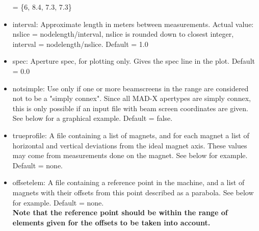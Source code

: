 \begin{itemize}
     = \{6, 8.4, 7.3, 7.3\}  
   \item interval: Approximate length in meters between
     measurements. Actual value:  nslice = nodelength/interval, nslice
     is rounded down to closest integer,  interval =
     nodelength/nslice. Default = 1.0  
   \item spec: Aperture spec, for plotting only. Gives the spec line in
     the plot. Default = 0.0  
   \item notsimple: Use only if one or more beamscreens in the range are
     considered not to  be a "simply connex". Since all MAD-X apertypes
     are simply connex, this is only possible  if an input file with
     beam screen coordinates are given. See below for a graphical
     example. Default = false.  
   \item trueprofile: A file containing a list of magnets, and for each
     magnet a list of horizontal and vertical deviations from the ideal
     magnet axis. These values may come from measurements done on the
     magnet. See below for example. Default = none.  
   \item offsetelem: A file containing a reference point in the machine,
     and a list of magnets with their offsets from this point described
     as a parabola. See below for example. Default = none. \\
     {\bf Note that the reference point should be within the range of
       elements given for the offsets to be taken into account.}
\end{itemize}


